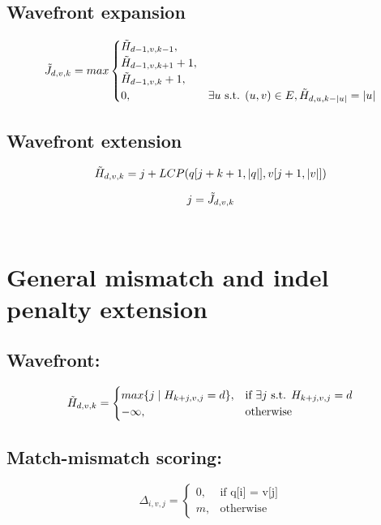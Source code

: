 \documentclass{article}
\begin{document}
\subsection{Wavefront expansion}
\begin{equation}
    \Tilde{J}_{d,v,k} = max \begin{cases}
        \Tilde{H}_{d-1,v,k-1}, \\
        \Tilde{H}_{d-1,v,k+1} + 1, \\
        \Tilde{H}_{d-1,v,k} + 1, \\
        0, & \exists u \text{ s.t. } (u, v) \in E, \Tilde{H}_{d,u,k - \lvert u \rvert} = \lvert u\rvert
    \end{cases}
\end{equation} 

\subsection{Wavefront extension}
\begin{equation}
    \Tilde{H}_{d,v,k} = j + LCP(q[j + k + 1, \lvert q \rvert], v[j + 1, \lvert v \rvert])
\end{equation}

$$j = \Tilde{J}_{d,v,k}$$
\\

\section{General mismatch and indel penalty extension}

\subsection{Wavefront:}
\begin{equation}
    \Tilde{H}_{d,v,k} = \begin{cases}
        max\{j \mid H_{k+j,v,j} = d\}, & \text{if } \exists j \text{ s.t. } H_{k+j,v,j} = d \\
        -\infty, & \text{otherwise}
    \end{cases}
\end{equation}


\subsection{Match-mismatch scoring:}
\begin{equation}
    \Delta_{i,v,j} = \begin{cases}
        0, & \text{if $$q[i] = v[j]$$} \\
        m, & \text{otherwise}
    \end{cases}
\end{equation}
\end{document}
